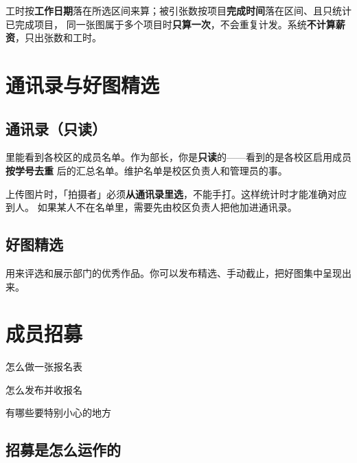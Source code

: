 \documentclass[cn,11pt,green]{elegantbook}
\begin{document}
\begin{notebox}[口径说明]
  工时按\textbf{工作日期}落在所选区间来算；被引张数按项目\textbf{完成时间}落在区间、且只统计已完成项目，
  同一张图属于多个项目时\textbf{只算一次}，不会重复计发。系统\textbf{不计算薪资}，只出张数和工时。
\end{notebox}

\chapter{通讯录与好图精选}

\section{通讯录（只读）}

里能看到各校区的成员名单。作为部长，你是\textbf{只读}的——看到的是各校区启用成员\textbf{按学号去重}
后的汇总名单。维护名单是校区负责人和管理员的事。

\begin{tipbox}[为什么拍摄者要从通讯录选]
  上传图片时，「拍摄者」必须\textbf{从通讯录里选}，不能手打。这样统计时才能准确对应到人。
  如果某人不在名单里，需要先由校区负责人把他加进通讯录。
\end{tipbox}

\section{好图精选}

用来评选和展示部门的优秀作品。你可以发布精选、手动截止，把好图集中呈现出来。

\chapter{成员招募}

\begin{introduction}
  \item 怎么做一张报名表
  \item 怎么发布并收报名
  \item 有哪些要特别小心的地方
\end{introduction}

\section{招募是怎么运作的}
\end{document}
